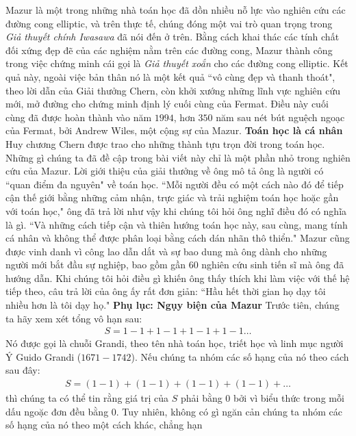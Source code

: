 \begin{multicols}{2}
	\vskip 0.01cm
	Mazur là một trong những nhà toán học đã dồn nhiều nỗ lực vào nghiên cứu các đường cong elliptic, và trên thực tế, chúng đóng một vai trò quan trọng trong \textit{Giả thuyết chính Iwasawa} đã nói đến ở trên. Bằng cách khai thác các tính chất đối xứng đẹp đẽ của các nghiệm nằm trên các đường cong, Mazur thành công trong  việc chứng minh cái gọi là \textit{Giả thuyết xoắn} cho các đường cong elliptic. Kết quả này, ngoài việc bản thân nó là một kết quả ``vô cùng đẹp và thanh thoát", theo lời dẫn của Giải thưởng Chern, còn khởi xướng những lĩnh vực nghiên cứu mới, mở đường cho chứng minh định lý cuối cùng của Fermat. Điều này cuối cùng đã được hoàn thành vào năm $1994$, hơn $350$ năm sau nét bút nguệch ngoạc của Fermat, bởi Andrew Wiles, một cộng sự của Mazur.
	\vskip 0.05cm
	\textbf{\color{duongvaotoanhoc}Toán học là cá nhân}
	\vskip 0.05cm
	Huy chương Chern được trao cho những thành tựu trọn đời trong toán học. Những gì chúng ta đã đề cập trong bài viết này chỉ là một phần nhỏ trong nghiên cứu của Mazur.
	\vskip 0.05cm
	Lời giới thiệu của giải thưởng về ông mô tả ông là người có ``quan điểm đa nguyên" về toán học. ``Mỗi người đều có một  cách nào đó để tiếp cận thế giới bằng những cảm nhận, trực giác và trải nghiệm toán học hoặc gần với toán học," ông đã trả lời như vậy khi chúng tôi hỏi ông nghĩ điều đó có nghĩa là gì. ``Và những cách tiếp cận và thiên hướng toán học này, sau cùng, mang tính cá nhân và không thể được phân loại bằng cách dán nhãn thô thiển."
	\vskip 0.05cm
	Mazur cũng được vinh danh vì công lao dẫn dắt và sự bao dung mà ông dành cho những người mới bắt đầu sự nghiệp, bao gồm gần $60$ nghiên cứu sinh tiến sĩ mà ông đã hướng dẫn. Khi chúng tôi hỏi điều gì khiến ông thấy thích khi làm việc với thế hệ tiếp theo, câu trả lời của ông ấy rất đơn giản: ``Hầu hết thời gian  họ dạy tôi nhiều hơn là tôi dạy họ."
	\vskip 0.05cm
	\textbf{\color{duongvaotoanhoc}Phụ lục: Ngụy biện của Mazur}
	\vskip 0.05cm
	Trước tiên, chúng ta hãy xem xét tổng vô hạn sau:
	\begin{align*}
		S = 1-1 + 1-1 + 1-1 + 1-1\ldots
	\end{align*}
	Nó được gọi là chuỗi Grandi, theo tên nhà toán học, triết học và linh mục người Ý Guido Grandi ($1671-1742$).
	\vskip 0.05cm
	Nếu chúng ta nhóm các số hạng của nó theo cách sau đây: 
	\begin{align*}
		S \!=\! (1\!-\!1) \!+\! (1\!-\!1) \!+\! (1\!-\!1) \!+\! (1\!-\!1) \!+\! \ldots
	\end{align*}
	thì chúng ta có thể tin rằng giá trị của $S$ phải bằng $0$ bởi vì biểu thức trong mỗi dấu ngoặc đơn đều bằng $0$. Tuy nhiên, không có gì ngăn cản chúng ta nhóm các số hạng của nó theo một cách khác, chẳng hạn

\end{multicols}
